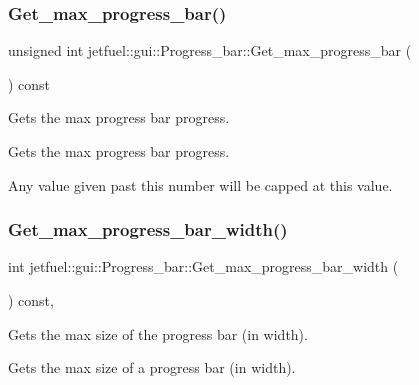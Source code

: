 \subsubsection{\texorpdfstring{Get\+\_\+max\+\_\+progress\+\_\+bar()}{Get\_max\_progress\_bar()}}
{\footnotesize\ttfamily unsigned int jetfuel\+::gui\+::\+Progress\+\_\+bar\+::\+Get\+\_\+max\+\_\+progress\+\_\+bar (\begin{DoxyParamCaption}{ }\end{DoxyParamCaption}) const\hspace{0.3cm}{\ttfamily [inline]}}



Gets the max progress bar progress. 

Gets the max progress bar progress.

Any value given past this number will be capped at this value. \mbox{\label{classjetfuel_1_1gui_1_1Progress__bar_ac8399712a5a25311f8f618ed33f730dc}} 
\subsubsection{\texorpdfstring{Get\+\_\+max\+\_\+progress\+\_\+bar\+\_\+width()}{Get\_max\_progress\_bar\_width()}}
{\footnotesize\ttfamily int jetfuel\+::gui\+::\+Progress\+\_\+bar\+::\+Get\+\_\+max\+\_\+progress\+\_\+bar\+\_\+width (\begin{DoxyParamCaption}{ }\end{DoxyParamCaption}) const\hspace{0.3cm}{\ttfamily [inline]}, {\ttfamily [protected]}}



Gets the max size of the progress bar (in width). 

Gets the max size of a progress bar (in width). \mbox{\label{classjetfuel_1_1gui_1_1Progress__bar_a5771ea71b321c173383e89537cea0ae1}} 
